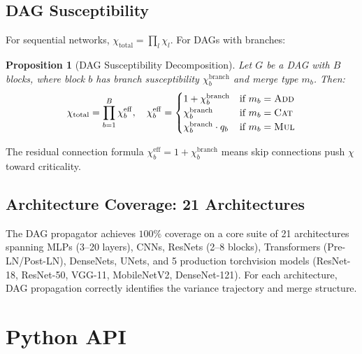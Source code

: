 \documentclass[10pt]{article}
\newtheorem{proposition}[theorem]{Proposition}
\begin{document}
\subsection{DAG Susceptibility}
\label{subsec:dag-chi}

For sequential networks, $\chi_{\mathrm{total}} = \prod_l \chi_l$.
For DAGs with branches:

\begin{proposition}[DAG Susceptibility Decomposition]
\label{prop:dag-chi}
Let $G$ be a DAG with $B$ blocks, where block $b$ has branch susceptibility $\chi_b^{\mathrm{branch}}$ and merge type $m_b$.  Then:
\begin{equation}
    \chi_{\mathrm{total}} = \prod_{b=1}^B \chi_b^{\mathrm{eff}}, \quad
    \chi_b^{\mathrm{eff}} = \begin{cases}
        1 + \chi_b^{\mathrm{branch}} & \text{if } m_b = \textsc{Add} \\
        \chi_b^{\mathrm{branch}} & \text{if } m_b = \textsc{Cat} \\
        \chi_b^{\mathrm{branch}} \cdot q_b & \text{if } m_b = \textsc{Mul}
    \end{cases}
    \label{eq:dag-chi}
\end{equation}
\end{proposition}

The residual connection formula $\chi_b^{\mathrm{eff}} = 1 + \chi_b^{\mathrm{branch}}$ means skip connections push $\chi$ toward criticality.

\subsection{Architecture Coverage: 21 Architectures}

The DAG propagator achieves $100\%$ coverage on a core suite of 21 architectures spanning MLPs (3--20 layers), CNNs, ResNets (2--8 blocks), Transformers (Pre-LN/Post-LN), DenseNets, UNets, and 5 production torchvision models (ResNet-18, ResNet-50, VGG-11, MobileNetV2, DenseNet-121).
For each architecture, DAG propagation correctly identifies the variance trajectory and merge structure.

\section{Python API}
\label{sec:api}
\end{document}
